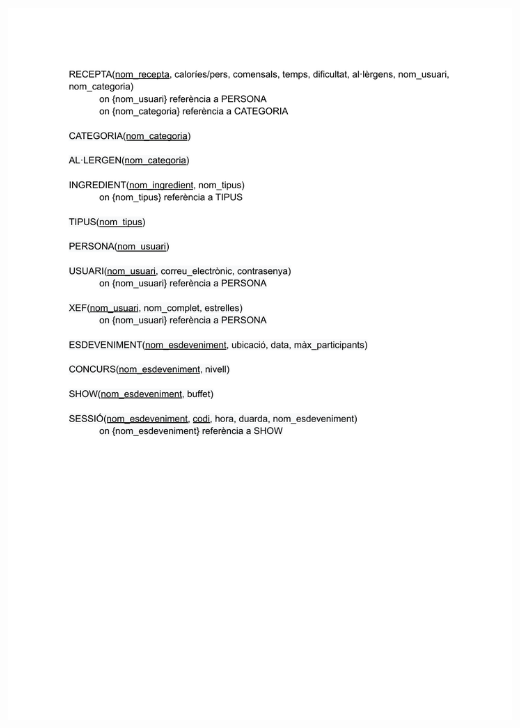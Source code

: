 \documentclass[a4paper,12pt]{article}
\begin{document}
\begin{center}
	\noindent\includegraphics[width=\textwidth]{Model relacional.pdf}

\end{center}
\end{document}
